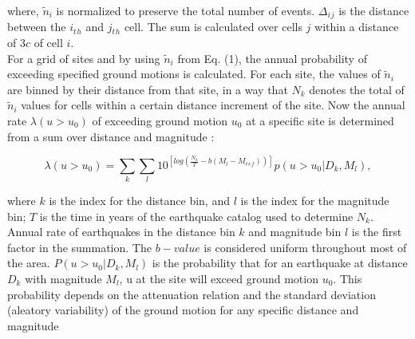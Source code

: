 \documentclass{article}
\begin{document}
\noindent
where,  $\tilde{n}_i$  is normalized to preserve the total number of events. $\Delta{_i{_j}}$ is the distance between the $i{_t{_h}}$ and $j{_t{_h}}$ cell. The sum is calculated over cells $j$ within a distance of $3c$ of cell $i$.\\
\noindent
For a grid of sites and by using $\tilde{n}_i$ from Eq. (1), the annual probability of exceeding specified ground motions is calculated. For each site, the values of $\tilde{n}_i$ are binned by their distance from that site, in a way that $N_k$ denotes the total of $\tilde{n}_i$ values for cells within a certain distance increment of the site. Now the annual rate $\lambda (u> u_0 )$ of exceeding ground motion $u_0$ at a specific site is determined from a sum over distance and magnitude \citet{Frankel1995}:



\begin{equation}
\lambda(u>u_{0}) = \sum_{k}\sum_{l}10^{[log(\frac{N_{k}}{T}-b(M_l-M{_r{_e{_f}}}))]} p(u>u_0 | D_k ,M_l),
\end{equation}

\noindent
where $k$ is the index for the distance bin, and $l$ is the index for the magnitude bin; $T$ is the time in years of the earthquake catalog used to determine $N_k$. Annual rate of earthquakes in the distance bin $k$ and magnitude bin $l$ is the first factor in the summation. The $b-value$ is considered uniform throughout most of the area. $P(u>u_0 | D_k,M_l )$ is the probability that for an earthquake at distance $D_k$ with magnitude $M_l$, u at the site will exceed  ground motion $u_0$. This probability depends on the attenuation relation and the standard deviation (aleatory variability) of the ground motion for any specific distance and magnitude \citep{Frankel1995}
\end{document}
